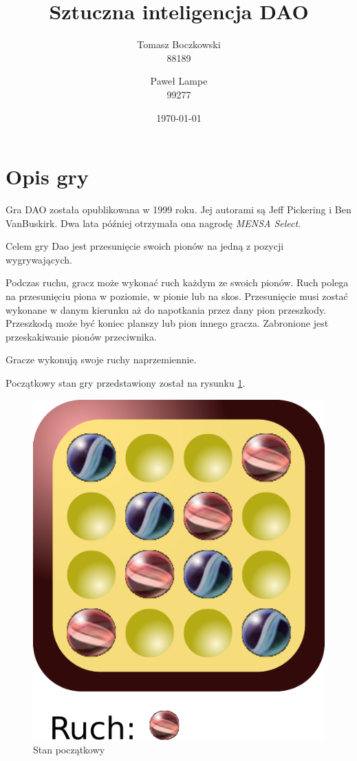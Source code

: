 \documentclass{scrartcl}
\title{Sztuczna inteligencja DAO}
\date{\today}
\author{Tomasz Boczkowski\\ 88189 \and Paweł Lampe\\ 99277}
\begin{document}


\section{Opis gry}

Gra DAO została opublikowana w 1999 roku. Jej autorami są 
Jeff Pickering i Ben VanBuskirk. Dwa lata później otrzymała ona 
nagrodę \emph{MENSA Select}.

Celem gry Dao jest przesunięcie swoich pionów na jedną z pozycji
wygrywających.

Podczas ruchu, gracz może wykonać ruch każdym ze swoich pionów. Ruch polega na przesunięciu piona w poziomie, w pionie lub na skos. Przesunięcie musi zostać wykonane w danym kierunku aż do napotkania przez dany pion przeszkody. Przeszkodą może być koniec planszy lub pion innego gracza. Zabronione jest przeskakiwanie pionów przeciwnika.

Gracze wykonują swoje ruchy naprzemiennie. 

Początkowy stan gry przedstawiony został na rysunku \ref{fig:begin}.

\begin{figure}[h]
  \centering
  \includegraphics[scale=0.6]{data/position0.pdf}
  \caption{Stan początkowy}
  \label{fig:begin}
\end{figure}
\end{document}
